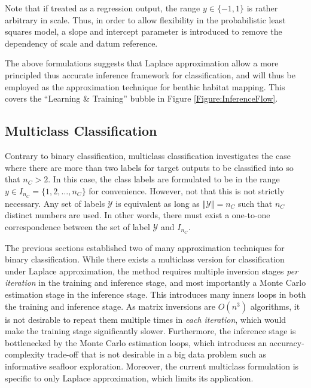 				Note that if treated as a regression output, the range $y \in \{-1, 1\}$ is rather arbitrary in scale. Thus, in order to allow flexibility in the probabilistic least squares model, a slope and intercept parameter is introduced to remove the dependency of scale and datum reference.
				
				The above formulations suggests that Laplace approximation allow a more principled thus accurate inference framework for classification, and will thus be employed as the approximation technique for benthic habitat mapping. This covers the ``Learning \& Training'' bubble in Figure \ref{Figure:InferenceFlow}.
			
		\subsection{Multiclass Classification}
		\label{BenthicHabitatMapping:Classification:MulticlassClassification}
		
			Contrary to binary classification, multiclass classification investigates the case where there are more than two labels for target outputs to be classified into so that $n_{C} > 2$. In this case, the class labels are formulated to be in the range $y \in I_{n_{C}} = \{1, 2, \dots, n_{C}\}$ for convenience. However, not that this is not strictly necessary. Any set of labels $\mathcal{Y}$ is equivalent as long as $\Vert \mathcal{Y} \Vert = n_{C}$ such that $n_{C}$ distinct numbers are used. In other words, there must exist a one-to-one correspondence between the set of label $\mathcal{Y}$ and $I_{n_{C}}$.
			
			The previous sections established two of many approximation techniques for binary classification. While there exists a multiclass version for classification under Laplace approximation, the method requires multiple inversion stages \textit{per iteration} in the training and inference stage, and most importantly a Monte Carlo estimation stage in the inference stage. This introduces many inners loops in both the training and inference stage. As matrix inversions are $O(n^{3})$ algorithms, it is not desirable to repeat them multiple times in \textit{each iteration}, which would make the training stage significantly slower. Furthermore, the inference stage is bottlenecked by the Monte Carlo estimation loops, which introduces an accuracy-complexity trade-off that is not desirable in a big data problem such as informative seafloor exploration. Moreover, the current multiclass formulation is specific to only Laplace approximation, which limits its application.
			
